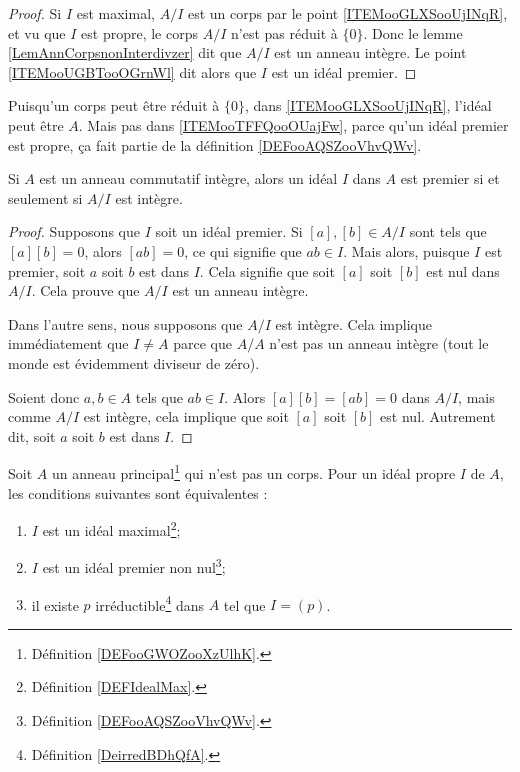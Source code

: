 \begin{proof}
	Si \( I\) est maximal, \( A/I\) est un corps par le point \ref{ITEMooGLXSooUjINqR}, et vu que \( I\) est propre, le corps \( A/I\) n'est pas réduit à \( \{ 0 \}\). Donc le lemme \ref{LemAnnCorpsnonInterdivzer} dit que \( A/I\) est un anneau intègre. Le point \ref{ITEMooUGBTooOGrnWl} dit alors que \( I\) est un idéal premier.
\end{proof}

\begin{remark}
	Puisqu'un corps peut être réduit à \( \{0\}\), dans \ref{ITEMooGLXSooUjINqR}, l'idéal peut être \( A\). Mais pas dans \ref{ITEMooTFFQooOUajFw}, parce qu'un idéal premier est propre, ça fait partie de la définition \ref{DEFooAQSZooVhvQWv}.
\end{remark}

\begin{proposition}     \label{PROPooHABIooBZZQMj}
	Si \( A\) est un anneau commutatif intègre, alors un idéal \( I\) dans \( A\) est premier si et seulement si \( A/I\) est intègre.
\end{proposition}

\begin{proof}
	Supposons que \( I\) soit un idéal premier. Si \( [a],[b] \in A/I\)  sont tels que \( [a][b]=0\), alors \( [ab]=0\), ce qui signifie que \( ab\in I\). Mais alors, puisque \( I\) est premier, soit \( a\) soit \( b\) est dans \( I\). Cela signifie que soit \( [a]\) soit \( [b]\) est nul dans \( A/I\). Cela prouve que \( A/I\) est un anneau intègre.

	Dans l'autre sens, nous supposons que \( A/I\) est intègre. Cela implique immédiatement que \( I\neq A\) parce que \( A/A\) n'est pas un anneau intègre (tout le monde est évidemment diviseur de zéro).

	Soient donc \( a,b\in A\) tels que \( ab\in I\). Alors \( [a][b]=[ab]=0\) dans \( A/I\), mais comme \( A/I\) est intègre, cela implique que soit \( [a]\) soit \( [b]\) est nul. Autrement dit, soit \( a\) soit \( b\) est dans \( I\).
\end{proof}

\begin{proposition} \label{PropomqcGe}
	Soit \( A\) un anneau principal\footnote{Définition \ref{DEFooGWOZooXzUlhK}.} qui n'est pas un corps. Pour un idéal propre \( I\) de \( A\), les conditions suivantes sont équivalentes :
	\begin{enumerate}
		\item       \label{ITEMooNOVFooEHtcwE}
		      \( I\) est un idéal maximal\footnote{Définition \ref{DEFIdealMax}.};
		\item       \label{ITEMooMQWVooNocVEU}
		      \( I\) est un idéal premier non nul\footnote{Définition \ref{DEFooAQSZooVhvQWv}.};
		\item       \label{ITEMooJBXGooEISNuW}
		      il existe \( p\) irréductible\footnote{Définition \ref{DeirredBDhQfA}.} dans \( A\) tel que \( I=(p)\).
	\end{enumerate}
\end{proposition}

